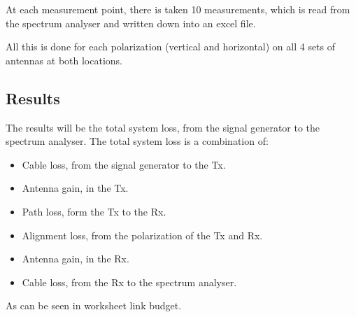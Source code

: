 At each measurement point, there is taken 10 measurements, which is read from the spectrum analyser and written down into an excel file.

All this is done for each polarization (vertical and horizontal) on all 4 sets of antennas at both locations.

\subsection*{Results}
The results will be the total system loss, from the signal generator to the spectrum analyser. The total system loss is a combination of:

\begin{itemize}
\item Cable loss, from the signal generator to the Tx.
\item Antenna gain, in the Tx.
\item Path loss, form the Tx to the Rx.
\item Alignment loss, from the polarization of the Tx and Rx.
\item Antenna gain, in the Rx.
\item Cable loss, from the Rx to the spectrum analyser.
\end{itemize}

As can be seen in worksheet link budget.
